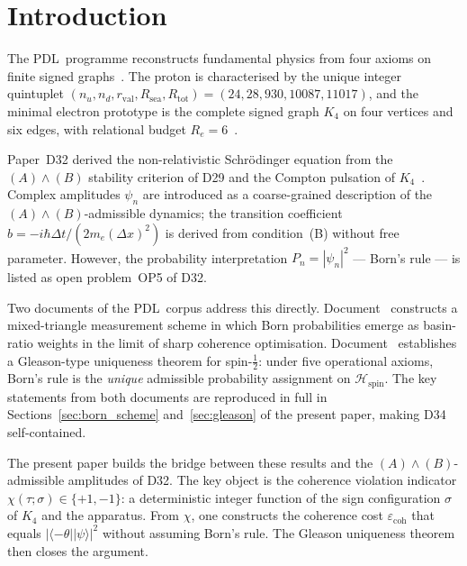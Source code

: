 \documentclass[11pt,a4paper]{article}
\theoremstyle{definition}
\newcommand{\PDL}{\textnormal{PDL}}
\newcommand{\Rtot}{R_{\mathrm{tot}}}
\newcommand{\rval}{r_{\mathrm{val}}}
\newcommand{\Rsea}{R_{\mathrm{sea}}}
\newcommand{\hb}{\hbar}
\newcommand{\Ree}{R_e}
\newcommand{\Kfour}{K_4}
\newcommand{\Hspin}{\mathcal{H}_{\mathrm{spin}}}
\newcommand{\ecoh}{\varepsilon_{\mathrm{coh}}}
\newcommand{\pket}[1]{|#1\rangle}
\newcommand{\pbra}[1]{\langle#1|}
\begin{document}
\section{Introduction}
\label{sec:intro}

The \PDL\ programme reconstructs fundamental physics from four axioms on finite signed graphs~\cite{PDL_Main_2026,PDL_Intro_2026}. The proton is characterised by the unique integer quintuplet $(n_u, n_d, \rval, \Rsea, \Rtot) = (24, 28, 930, 10087, 11017)$, and the minimal electron prototype is the complete signed graph $\Kfour$ on four vertices and six edges, with relational budget $\Ree = 6$~\cite{Combinatorial_Proton_v2_2026}.

Paper~D32 derived the non-relativistic Schr\"odinger equation from the $(A)\wedge(B)$ stability criterion of D29 and the Compton pulsation of $\Kfour$~\cite{PDL_D32_2026}. Complex amplitudes $\psi_n$ are introduced as a coarse-grained description of the $(A)\wedge(B)$-admissible dynamics; the transition coefficient $b = -i\hb\Delta t/(2m_e(\Delta x)^2)$ is derived from condition~(B) without free parameter. However, the probability interpretation $P_n = |\psi_n|^2$ --- Born's rule --- is listed as open problem~OP5 of D32.

Two documents of the \PDL\ corpus address this directly. Document~\cite{Born_PDL_2026} constructs a mixed-triangle measurement scheme in which Born probabilities emerge as basin-ratio weights in the limit of sharp coherence optimisation. Document~\cite{Gleason_PDL_2026} establishes a Gleason-type uniqueness theorem for spin-$\tfrac{1}{2}$: under five operational axioms, Born's rule is the \emph{unique} admissible probability assignment on $\Hspin$. The key statements from both documents are reproduced in full in Sections~\ref{sec:born_scheme} and~\ref{sec:gleason} of the present paper, making D34 self-contained.

The present paper builds the bridge between these results and the $(A)\wedge(B)$-admissible amplitudes of D32. The key object is the coherence violation indicator $\chi(\tau;\sigma) \in \{+1,-1\}$: a deterministic integer function of the sign configuration $\sigma$ of $\Kfour$ and the apparatus. From $\chi$, one constructs the coherence cost $\ecoh$ that equals $|\pbra{-\theta}\pket{\psi}|^2$ without assuming Born's rule. The Gleason uniqueness theorem then closes the argument.

\end{document}
